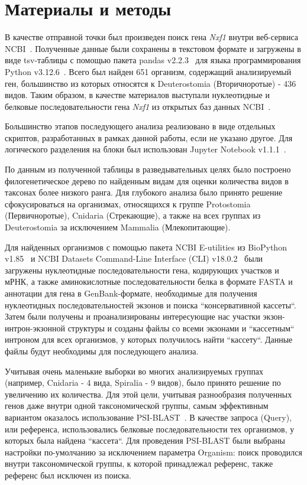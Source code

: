 \newpage
\section{Материалы и методы}

В качестве отправной точки был произведен поиск гена \textit{Nxf1} внутри веб-сервиса NCBI~\cite{ncbi_general}.
Полученные данные были сохранены в текстовом формате и загружены в виде tsv-таблицы с помощью пакета pandas v2.2.3~\cite{pandas} для языка программирования Python v3.12.6~\cite{python_3_12}.
Всего был найден 651 организм, содержащий анализируемый ген, большинство из которых относятся к Deuterostomia (Вторичноротые) - 436 видов.
Таким образом, в качестве материалов выступали нуклеотидные и белковые последовательности гена \textit{Nxf1} из открытых баз данных NCBI~\cite{ncbi_general}.

Большинство этапов последующего анализа реализовано в виде отдельных скриптов, разработанных в рамках данной работы, если не указано другое.
Для логического разделения на блоки был использован Jupyter Notebook v1.1.1~\cite{jupyter_notebook}.

По данным из полученной таблицы в разведывательных целях было построено филогенетическое дерево по найденным видам для оценки количества видов в таксонах более низкого ранга.
Для глубокого анализа было принято решение сфокусироваться на организмах, относящихся к группе Protostomia (Первичноротые), Cnidaria (Стрекающие), а также на всех группах из Deuterostomia за исключением Mammalia (Млекопитающие).

Для найденных организмов с помощью пакета NCBI E-utilities из BioPython v1.85~\cite{biopython} и NCBI Datasets Command-Line Interface (CLI) v18.0.2~\cite{datasets} были загружены нуклеотидные последовательности гена, кодирующих участков и мРНК, а также аминокислотные последовательности белка в формате FASTA и аннотации для гена в GenBank-формате, необходимые для получения нуклеотидных последовательностей экзонов и поиска ``консервативной кассеты``.
Затем были получены и проанализированы интересующие нас участки экзон-интрон-экзонной структуры и созданы файлы со всеми экзонами и ``кассетным`` интроном для всех организмов, у которых получилось найти ``кассету``.
Данные файлы будут необходимы для последующего анализа.

Учитывая очень маленькие выборки во многих анализируемых группах (например, Cnidaria - 4 вида, Spiralia - 9 видов), было принято решение по увеличению их количества.
Для этой цели, учитывая разнообразия полученных генов даже внутри одной таксономической группы, самым эффективным вариантом оказалось использование PSI-BLAST~\cite{psi_blast}.
В качестве запроса (Query), или референса, использовались белковые последовательности тех организмов, у которых была найдена ``кассета``.
Для проведения PSI-BLAST были выбраны настройки по-умолчанию за исключением параметра Organism: поиск проводился внутри таксономической группы, к которой принадлежал референс, также референс был исключен из поиска.

